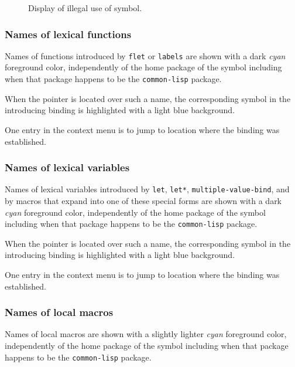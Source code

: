 \begin{figure}
\begin{center}
\end{center}
\caption{\label{fig-illegal-use-of-cl-symbol}
Display of illegal use of \commonlisp{} symbol.}
\end{figure}

\subsubsection{Names of lexical functions}

Names of functions introduced by \texttt{flet} or \texttt{labels} are
shown with a dark \emph{cyan} foreground color, independently of the
home package of the symbol including when that package happens to be
the \texttt{common-lisp} package.

When the pointer is located over such a name, the corresponding symbol
in the introducing binding is highlighted with a light blue
background. 

One entry in the context menu is to jump to location where the binding
was established. 

\subsubsection{Names of lexical variables}

Names of lexical variables introduced by \texttt{let}, \texttt{let*},
\texttt{multiple-value-bind}, and by macros that expand into one of
these special forms are shown with a dark \emph{cyan}
foreground color, independently of the home package of the symbol
including when that package happens to be the \texttt{common-lisp}
package.

When the pointer is located over such a name, the corresponding symbol
in the introducing binding is highlighted with a light blue
background. 

One entry in the context menu is to jump to location where the binding
was established. 

\subsubsection{Names of local macros}

Names of local macros are shown with a slightly lighter \emph{cyan}
foreground color, independently of the home package of the symbol
including when that package happens to be the \texttt{common-lisp}
package.

